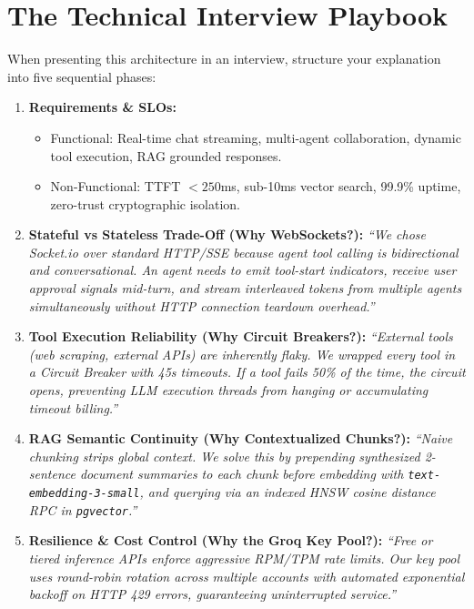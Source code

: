 \documentclass[10pt,a4paper]{article}
\begin{document}
\section{The Technical Interview Playbook}

\begin{interviewplaybook}
When presenting this architecture in an interview, structure your explanation into five sequential phases:
\begin{enumerate}[leftmargin=*]
    \item \textbf{Requirements \& SLOs:}
    \begin{itemize}
        \item Functional: Real-time chat streaming, multi-agent collaboration, dynamic tool execution, RAG grounded responses.
        \item Non-Functional: TTFT $< 250$ms, sub-10ms vector search, 99.9\% uptime, zero-trust cryptographic isolation.
    \end{itemize}
    \item \textbf{Stateful vs Stateless Trade-Off (Why WebSockets?):}
    \textit{``We chose Socket.io over standard HTTP/SSE because agent tool calling is bidirectional and conversational. An agent needs to emit tool-start indicators, receive user approval signals mid-turn, and stream interleaved tokens from multiple agents simultaneously without HTTP connection teardown overhead.''}
    \item \textbf{Tool Execution Reliability (Why Circuit Breakers?):}
    \textit{``External tools (web scraping, external APIs) are inherently flaky. We wrapped every tool in a Circuit Breaker with 45s timeouts. If a tool fails 50\% of the time, the circuit opens, preventing LLM execution threads from hanging or accumulating timeout billing.''}
    \item \textbf{RAG Semantic Continuity (Why Contextualized Chunks?):}
    \textit{``Naive chunking strips global context. We solve this by prepending synthesized 2-sentence document summaries to each chunk before embedding with \texttt{text-embedding-3-small}, and querying via an indexed HNSW cosine distance RPC in \texttt{pgvector}.''}
    \item \textbf{Resilience \& Cost Control (Why the Groq Key Pool?):}
    \textit{``Free or tiered inference APIs enforce aggressive RPM/TPM rate limits. Our key pool uses round-robin rotation across multiple accounts with automated exponential backoff on HTTP 429 errors, guaranteeing uninterrupted service.''}
\end{enumerate}
\end{interviewplaybook}
\end{document}
